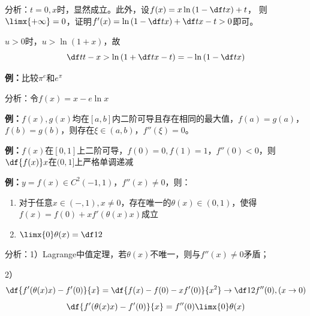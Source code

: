 分析：$t=0,x$时，显然成立。此外，设$f(x)=x\ln\left(1-\df tx\right)+t$，
则$\limx{+\infty}=0$，证明$f'(x)=\ln\left(1-\df tx\right)+\df t{x-t}>0$即可。

$u>0$时，$u>\ln(1+x)$，故
$$\df t{t-x}>\ln\left(1+\df t{x-t}\right)=-\ln\left(1-\df tx\right)$$

{\bf 例：}比较$\pi^e$和$e^{\pi}$

分析：令$f(x)=x-e\ln x$

{\bf 例：}$f(x),g(x)$均在$[a,b]$内二阶可导且存在相同的最大值，$f(a)=g(a)$，
$f(b)=g(b)$，则存在$\xi\in(a,b)$，$f''(\xi)=0$。

{\bf 例：}$f(x)$在$[0,1]$上二阶可导，$f(0)=0,f(1)=1$，$f''(0)<0$，则
$\df{f(x)}x$在$(0,1]$上严格单调递减

{\bf 例：}$y=f(x)\in C^2(-1,1)$，$f''(x)\ne 0$，则：
\begin{enumerate}[1)]
  \setlength{\itemindent}{1cm}
  \item 对于任意$x\in(-,1),x\ne 0$，存在唯一的$\theta(x)\in(0,1)$，使得
  $f(x)=f(0)+xf'(\theta(x)x)$成立
  \item $\limx{0}\theta(x)=\df12$
\end{enumerate}

分析：1）Lagrange中值定理，若$\theta(x)$不唯一，则与$f''(x)\ne 0$矛盾；

2）
$$\df{f'(\theta(x)x)-f'(0)}{x}=\df{f(x)-f(0)-xf'(0)}{x^2}\to\df12f''(0),(x\to0)$$
$$\df{f'(\theta(x)x)-f'(0)}{x}=f''(0)\limx{0}\theta(x)$$